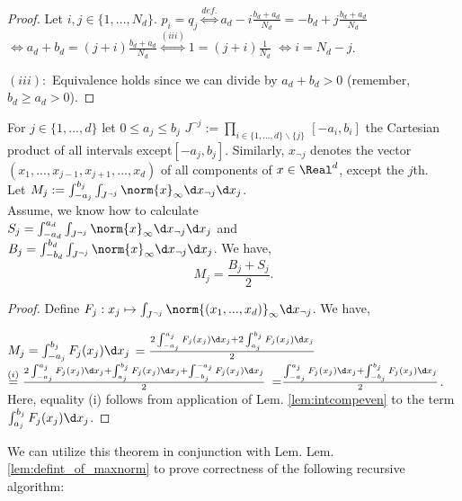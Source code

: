 \begin{lem}
\begin{proof}
Let $i,j \in \{1,...,N_d\}$.
$p_i = q_j \stackrel{def.}{\Leftrightarrow}  a_d - i \frac{b_d+a_d}{N_d} = -b_d + j \frac{b_d+a_d}{N_d} $
$\Leftrightarrow a_d +b_d  =  (j+i) \frac{b_d+a_d}{N_d} \stackrel{(iii)}{\Leftrightarrow}  1 =  (j+i) \frac{1}{N_d} $
${\Leftrightarrow}  i = N_d -j$.

$(iii):$ Equivalence holds since we can divide by $a_d+b_d >0 $ (remember, $b_d \geq a_d > 0$).  
\end{proof}

\end{lem}

\begin{thm}  For $j \in \{1,...,d\}$ let $0 \leq a_j \leq b_j$ $J^{\neg j} := \prod_{i \in \{1,...,d\} \backslash \{j\}} \, [-a_i,b_i]$ the Cartesian product of all intervals except$ [-a_j,b_j]$. Similarly, $x_{\neg j}$ denotes the vector $(x_1,...,x_{j-1},x_{j+1},...,x_d)$ of all components of $x \in \Real^d$, except the $j$th.  
\\ 

Let $M_j := \int_{-a_j}^{b_j} \int_{J^{\neg j}} \norm{x}_\infty \d x_{\neg j} \d x_j$.\\
Assume, we know how to calculate \\
$S_j = \int_{-a_d}^{a_d} \int_{J^{\neg j}} \norm{x}_\infty  \d x_{\neg j} \d x_j$ and \\
$B_j = \int_{-b_d}^{b_d} \int_{J^{\neg j}} \norm{x}_\infty \d x_{\neg j} \d x_j$. We have,
\[M_j = \frac{B_j + S_j}{2}.\]

\begin{proof}
Define $F_j : x_j \mapsto \int_{J^{\neg j}} \norm{(x_1,...,x_d)}_\infty \d x_{\neg j} $. We have,
 
$M_j =  \int_{-a_j}^{b_j} F_j(x_j) \d x_j $
$= \frac{ 2 \int_{-a_j}^{a_j} F_j(x_j) \d x_j + 2 \int_{a_j}^{b_j} F_j(x_j) \d x_j }{2}$
$\stackrel{(i) }{=} \frac{ 2 \int_{-a_j}^{a_j} F_j(x_j) \d x_j +  \int_{a_j}^{b_j} F_j(x_j) \d x_j 
+ \int_{-b_j}^{-a_j} F_j(x_j) \d x_j }{2}$
${=} \frac{  \int_{-a_j}^{a_j} F_j(x_j) \d x_j +  \int_{-b_j}^{b_j} F_j(x_j) \d x_j}{2}$.
Here, equality (i) follows from application of Lem. \ref{lem:intcompeven} to the term $\int_{a_j}^{b_j} F_j(x_j) \d x_j $.
\end{proof}
\end{thm}

We can utilize this theorem in conjunction with Lem. Lem. \ref{lem:defint_of_maxnorm} to prove correctness of the following recursive algorithm:  

